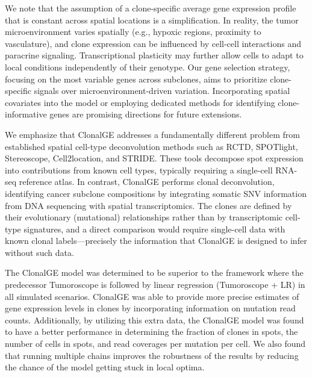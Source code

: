 \documentclass[unnumsec,webpdf,contemporary,large]{oup-authoring-template}%
\theoremstyle{thmstyleone}%
\theoremstyle{thmstyletwo}%
\theoremstyle{thmstylethree}%
\newcommand{\rev}[1]{{\color{revisionblue}#1}}
\begin{document}
\rev{We note that the assumption of a clone-specific average gene expression profile that is constant across spatial locations is a simplification. In reality, the tumor microenvironment varies spatially (e.g., hypoxic regions, proximity to vasculature), and clone expression can be influenced by cell-cell interactions and paracrine signaling. Transcriptional plasticity may further allow cells to adapt to local conditions independently of their genotype. Our gene selection strategy, focusing on the most variable genes across subclones, aims to prioritize clone-specific signals over microenvironment-driven variation. Incorporating spatial covariates into the model or employing dedicated methods for identifying clone-informative genes are promising directions for future extensions.}

\rev{We emphasize that ClonalGE addresses a fundamentally different problem from established spatial cell-type deconvolution methods such as RCTD, SPOTlight, Stereoscope, Cell2location, and STRIDE. These tools decompose spot expression into contributions from known cell types, typically requiring a single-cell RNA-seq reference atlas. In contrast, ClonalGE performs clonal deconvolution, identifying cancer subclone compositions by integrating somatic SNV information from DNA sequencing with spatial transcriptomics. The clones are defined by their evolutionary (mutational) relationships rather than by transcriptomic cell-type signatures, and a direct comparison would require single-cell data with known clonal labels---precisely the information that ClonalGE is designed to infer without such data.}

The ClonalGE model was determined to be superior to the framework where the predecessor Tumoroscope is followed by linear regression (Tumoroscope + LR) in all simulated scenarios. ClonalGE was able to provide more precise estimates of gene expression levels in clones by incorporating information on mutation read counts. Additionally, by utilizing this extra data, the ClonalGE model was found to have a better performance in determining the fraction of clones in spots, the number of cells in spots, and read coverages per mutation per cell. We also found that running multiple chains improves the robustness of the results by reducing the chance of the model getting stuck in local optima.
\end{document}
